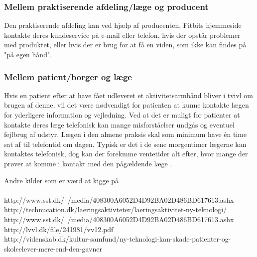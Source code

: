 \subsubsection{Mellem praktiserende afdeling/læge og producent}
Den praktiserende afdeling kan ved hjælp af producenten, Fitbits hjemmeside kontakte deres kundeservice på e-mail eller telefon, hvis der opstår problemer med produktet, eller hvis der er brug for at få en viden, som ikke kan findes på "på egen hånd". 

\subsubsection{Mellem patient/borger og læge}
Hvis en patient efter at have fået udleveret et aktivitetsarmbånd bliver i tvivl om brugen af denne, vil det være nødvendigt for patienten at kunne kontakte lægen for yderligere information og vejledning. Ved at det er muligt for patienter at kontakte deres læge telefonisk kan mange misforståelser undgås og eventuel fejlbrug af udstyr. Lægen i den almene praksis skal som minimum have én time sat af til telefontid om dagen. Typisk er det i de sene morgentimer lægerne kan kontaktes telefonisk, dog kan der forekmme ventetider alt efter, hvor mange der prøver at komme i kontakt med den pågældende læge \citep{vedsted2005}. 


Andre kilder som er værd at kigge på \\\\

http://www.sst.dk/~/media/408300A6052D4D92BA02D486BD617613.ashx \\
http://technucation.dk/laeringsaktivteter/laeringsaktivitet-ny-teknologi/ \\
http://www.sst.dk/~/media/408300A6052D4D92BA02D486BD617613.ashx \\
http://lvvl.dk/file/241981/vv12.pdf \\

http://videnskab.dk/kultur-samfund/ny-teknologi-kan-skade-patienter-og-skoleelever-mere-end-den-gavner

